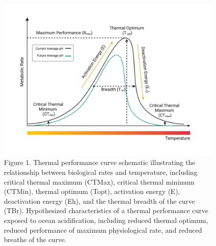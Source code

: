\documentclass[
  12pt,
]{article}
\begin{document}
\begin{figure}[htbp]
    \centering
    \includegraphics[width=1\textwidth]{Images/thermal_performance_curve_schematic.png}
    \caption{Figure 1. Thermal performance curve schematic illustrating the relationship between biological rates and temperature, including critical thermal maximum (CTMax), critical thermal minimum (CTMin), thermal optimum (Topt), activation energy (E), deactivation energy (Eh), and the thermal breadth of the curve (TBr). Hypothesized characteristics of a thermal performance curve exposed to ocean acidification, including reduced thermal optimum, reduced performance of maximum physiological rate, and reduced breathe of the curve.}
    \label{fig:thermal-performance-curve-schematic}
\end{figure}
\end{document}
